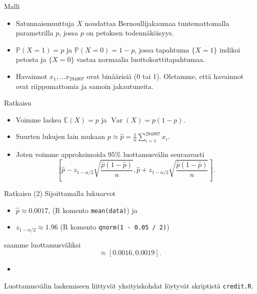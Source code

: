 \documentclass{beamer}
\DeclareMathOperator{\var}{Var}
\begin{document}

\begin{frame}{Malli}
  \begin{itemize}
    \item Satunnaismuuttuja $X$ noudattaa Bernoullijakaumaa tuntemattomalla
    parametrilla $p$, jossa $p$ on petoksen todennäköisyys.
    \item $\mathbb{P}\left(X = 1\right) = p$ ja $\mathbb{P}\left(X = 0\right) =
    1 - p$, jossa tapahtuma $\{X = 1\}$ indikoi petosta ja $\{X = 0\}$ vastaa
    normaalia luottokorttitapahtumaa.
    \item Havainnot $x_1, \ldots x_{284807}$ ovat binäärisiä (0 tai 1).
    Oletamme, että havainnot ovat riippumattomia ja samoin jakautuneita.
  \end{itemize}
\end{frame}


\begin{frame}{Ratkaisu}
  \begin{itemize}
    \item Voimme laskea $\mathbb{E}\left(X\right) = p$ ja $\var\left(X\right) =
    p(1-p)$.
    \item Suurten lukujen lain mukaan $p \approx \hat p =
    \frac{1}{n}\sum_{i=1}^{284807} x_i$.
    \item Joten voimme approksimoida $95\%$ luottamusvälin seuraavasti
    \begin{equation*}
      \left[\hat p - z_{1 - \alpha/2}\sqrt{\frac{\hat p(1-\hat p)}{n}},
      \hat p + z_{1 - \alpha/2}\sqrt{\frac{\hat p(1-\hat p)}{n}}\right].
    \end{equation*}
  \end{itemize}
\end{frame}


\begin{frame}{Ratkaisu (2)}
  Sijoittamalla lukuarvot
  \begin{itemize}
    \item $\hat p\approx 0.0017$, (\textsf{R} komento \texttt{mean(data)}) ja
    \item $z_{1 - \alpha / 2} \approx 1.96$ (\textsf{R} komento \texttt{qnorm(1
    - 0.05 / 2)})
  \end{itemize}
  saamme luottamusväliksi
  \begin{equation*}
    \approx \left[0.0016, 0.0019\right].
  \end{equation*}
  \pause
  \begin{itemize}
    \item[]
  \end{itemize}
  Luottamusvälin laskemiseen liittyvät yksityiskohdat löytyvät skriptistä
  \texttt{credit.R}. 
\end{frame}
\end{document}
